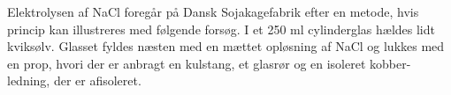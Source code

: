 

\forfatter{}

Elektrolysen af NaCl foregår på Dansk Sojakagefabrik efter en metode, hvis
princip kan illustreres med følgende forsøg.
I et 250 ml cylinderglas hældes lidt kviksølv. Glasset fyldes næsten med en
mættet opløsning af NaCl og lukkes med en prop, hvori der er anbragt en
kulstang, et glasrør og en isoleret kobber-ledning, der er afisoleret.
